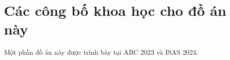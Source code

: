 \documentclass[13pt,a4paper,font=cm]{report}
\theoremstyle{definition}
\begin{document}



\newpage
\appendix
\chapter{Các công bố khoa học cho đồ án này}
Một phần đồ án này được trình bày tại ABC 2023 và ISAS 2024.
\end{document}
